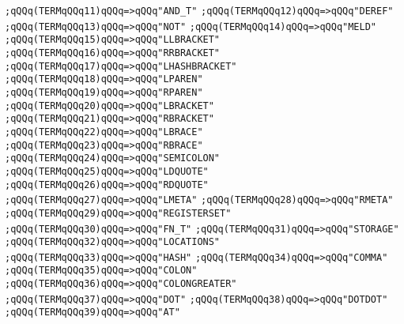 \verb|;qQQq(TERMqQQq11)qQQq=>qQQq"AND_T"|\newline
\verb|;qQQq(TERMqQQq12)qQQq=>qQQq"DEREF"|\newline
\verb|;qQQq(TERMqQQq13)qQQq=>qQQq"NOT"|\newline
\verb|;qQQq(TERMqQQq14)qQQq=>qQQq"MELD"|\newline
\verb|;qQQq(TERMqQQq15)qQQq=>qQQq"LLBRACKET"|\newline
\verb|;qQQq(TERMqQQq16)qQQq=>qQQq"RRBRACKET"|\newline
\verb|;qQQq(TERMqQQq17)qQQq=>qQQq"LHASHBRACKET"|\newline
\verb|;qQQq(TERMqQQq18)qQQq=>qQQq"LPAREN"|\newline
\verb|;qQQq(TERMqQQq19)qQQq=>qQQq"RPAREN"|\newline
\verb|;qQQq(TERMqQQq20)qQQq=>qQQq"LBRACKET"|\newline
\verb|;qQQq(TERMqQQq21)qQQq=>qQQq"RBRACKET"|\newline
\verb|;qQQq(TERMqQQq22)qQQq=>qQQq"LBRACE"|\newline
\verb|;qQQq(TERMqQQq23)qQQq=>qQQq"RBRACE"|\newline
\verb|;qQQq(TERMqQQq24)qQQq=>qQQq"SEMICOLON"|\newline
\verb|;qQQq(TERMqQQq25)qQQq=>qQQq"LDQUOTE"|\newline
\verb|;qQQq(TERMqQQq26)qQQq=>qQQq"RDQUOTE"|\newline
\verb|;qQQq(TERMqQQq27)qQQq=>qQQq"LMETA"|\newline
\verb|;qQQq(TERMqQQq28)qQQq=>qQQq"RMETA"|\newline
\verb|;qQQq(TERMqQQq29)qQQq=>qQQq"REGISTERSET"|\newline
\verb|;qQQq(TERMqQQq30)qQQq=>qQQq"FN_T"|\newline
\verb|;qQQq(TERMqQQq31)qQQq=>qQQq"STORAGE"|\newline
\verb|;qQQq(TERMqQQq32)qQQq=>qQQq"LOCATIONS"|\newline
\verb|;qQQq(TERMqQQq33)qQQq=>qQQq"HASH"|\newline
\verb|;qQQq(TERMqQQq34)qQQq=>qQQq"COMMA"|\newline
\verb|;qQQq(TERMqQQq35)qQQq=>qQQq"COLON"|\newline
\verb|;qQQq(TERMqQQq36)qQQq=>qQQq"COLONGREATER"|\newline
\verb|;qQQq(TERMqQQq37)qQQq=>qQQq"DOT"|\newline
\verb|;qQQq(TERMqQQq38)qQQq=>qQQq"DOTDOT"|\newline
\verb|;qQQq(TERMqQQq39)qQQq=>qQQq"AT"|\newline
